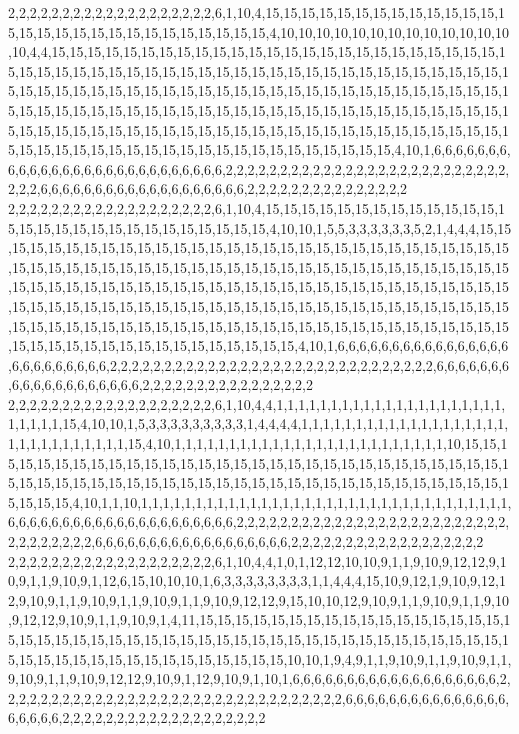 2,2,2,2,2,2,2,2,2,2,2,2,2,2,2,2,2,2,2,6,1,10,4,15,15,15,15,15,15,15,15,15,15,15,15,15,15,15,15,15,15,15,15,15,15,15,15,15,15,15,15,4,10,10,10,10,10,10,10,10,10,10,10,10,10,10,4,4,15,15,15,15,15,15,15,15,15,15,15,15,15,15,15,15,15,15,15,15,15,15,15,15,15,15,15,15,15,15,15,15,15,15,15,15,15,15,15,15,15,15,15,15,15,15,15,15,15,15,15,15,15,15,15,15,15,15,15,15,15,15,15,15,15,15,15,15,15,15,15,15,15,15,15,15,15,15,15,15,15,15,15,15,15,15,15,15,15,15,15,15,15,15,15,15,15,15,15,15,15,15,15,15,15,15,15,15,15,15,15,15,15,15,15,15,15,15,15,15,15,15,15,15,15,15,15,15,15,15,15,15,15,15,15,15,15,15,15,15,15,15,15,15,15,15,15,15,15,15,15,15,15,15,15,15,15,15,15,4,10,1,6,6,6,6,6,6,6,6,6,6,6,6,6,6,6,6,6,6,6,6,6,6,6,6,6,6,6,2,2,2,2,2,2,2,2,2,2,2,2,2,2,2,2,2,2,2,2,2,2,2,2,2,2,2,2,2,6,6,6,6,6,6,6,6,6,6,6,6,6,6,6,6,6,6,6,2,2,2,2,2,2,2,2,2,2,2,2,2,2,2
2,2,2,2,2,2,2,2,2,2,2,2,2,2,2,2,2,2,2,6,1,10,4,15,15,15,15,15,15,15,15,15,15,15,15,15,15,15,15,15,15,15,15,15,15,15,15,15,15,15,15,4,10,10,1,5,5,3,3,3,3,3,3,5,2,1,4,4,4,15,15,15,15,15,15,15,15,15,15,15,15,15,15,15,15,15,15,15,15,15,15,15,15,15,15,15,15,15,15,15,15,15,15,15,15,15,15,15,15,15,15,15,15,15,15,15,15,15,15,15,15,15,15,15,15,15,15,15,15,15,15,15,15,15,15,15,15,15,15,15,15,15,15,15,15,15,15,15,15,15,15,15,15,15,15,15,15,15,15,15,15,15,15,15,15,15,15,15,15,15,15,15,15,15,15,15,15,15,15,15,15,15,15,15,15,15,15,15,15,15,15,15,15,15,15,15,15,15,15,15,15,15,15,15,15,15,15,15,15,15,15,15,15,15,15,15,15,15,15,15,15,15,15,15,15,15,15,4,10,1,6,6,6,6,6,6,6,6,6,6,6,6,6,6,6,6,6,6,6,6,6,6,6,6,6,2,2,2,2,2,2,2,2,2,2,2,2,2,2,2,2,2,2,2,2,2,2,2,2,2,2,2,2,2,2,6,6,6,6,6,6,6,6,6,6,6,6,6,6,6,6,6,6,6,2,2,2,2,2,2,2,2,2,2,2,2,2,2,2,2
2,2,2,2,2,2,2,2,2,2,2,2,2,2,2,2,2,2,2,6,1,10,4,4,1,1,1,1,1,1,1,1,1,1,1,1,1,1,1,1,1,1,1,1,1,1,1,1,1,1,15,4,10,10,1,5,3,3,3,3,3,3,3,3,3,1,4,4,4,4,1,1,1,1,1,1,1,1,1,1,1,1,1,1,1,1,1,1,1,1,1,1,1,1,1,1,1,1,1,1,15,4,10,1,1,1,1,1,1,1,1,1,1,1,1,1,1,1,1,1,1,1,1,1,1,1,1,1,10,15,15,15,15,15,15,15,15,15,15,15,15,15,15,15,15,15,15,15,15,15,15,15,15,15,15,15,15,15,15,15,15,15,15,15,15,15,15,15,15,15,15,15,15,15,15,15,15,15,15,15,15,15,15,15,15,15,15,15,15,15,15,4,10,1,1,10,1,1,1,1,1,1,1,1,1,1,1,1,1,1,1,1,1,1,1,1,1,1,1,1,1,1,1,1,1,1,1,1,1,1,6,6,6,6,6,6,6,6,6,6,6,6,6,6,6,6,6,6,6,6,6,2,2,2,2,2,2,2,2,2,2,2,2,2,2,2,2,2,2,2,2,2,2,2,2,2,2,2,2,2,2,2,2,2,6,6,6,6,6,6,6,6,6,6,6,6,6,6,6,6,6,6,2,2,2,2,2,2,2,2,2,2,2,2,2,2,2,2,2,2
2,2,2,2,2,2,2,2,2,2,2,2,2,2,2,2,2,2,2,6,1,10,4,4,1,0,1,12,12,10,10,9,1,1,9,10,9,12,12,9,10,9,1,1,9,10,9,1,12,6,15,10,10,10,1,6,3,3,3,3,3,3,3,3,1,1,4,4,4,15,10,9,12,1,9,10,9,12,12,9,10,9,1,1,9,10,9,1,1,9,10,9,1,1,9,10,9,12,12,9,15,10,10,12,9,10,9,1,1,9,10,9,1,1,9,10,9,12,12,9,10,9,1,1,9,10,9,1,4,11,15,15,15,15,15,15,15,15,15,15,15,15,15,15,15,15,15,15,15,15,15,15,15,15,15,15,15,15,15,15,15,15,15,15,15,15,15,15,15,15,15,15,15,15,15,15,15,15,15,15,15,15,15,15,15,15,15,15,15,15,15,10,10,1,9,4,9,1,1,9,10,9,1,1,9,10,9,1,1,9,10,9,1,1,9,10,9,12,12,9,10,9,1,12,9,10,9,1,10,1,6,6,6,6,6,6,6,6,6,6,6,6,6,6,6,6,6,6,6,2,2,2,2,2,2,2,2,2,2,2,2,2,2,2,2,2,2,2,2,2,2,2,2,2,2,2,2,2,2,2,2,6,6,6,6,6,6,6,6,6,6,6,6,6,6,6,6,6,6,6,6,2,2,2,2,2,2,2,2,2,2,2,2,2,2,2,2,2,2,2
